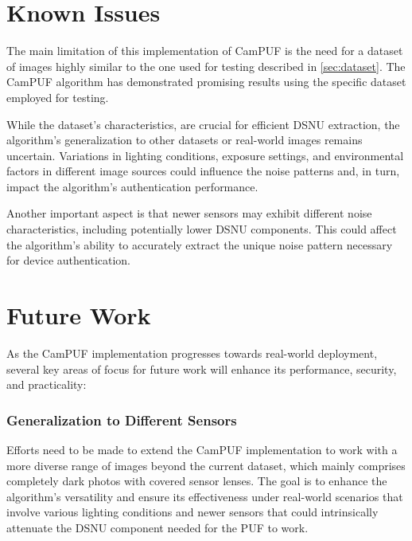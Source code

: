 \section{Known Issues}
The main limitation of this implementation of CamPUF is the need for a dataset of images highly similar to the one used for testing described in \ref{sec:dataset}. The CamPUF algorithm has demonstrated promising results using the specific dataset employed for testing.

While the dataset's characteristics, are crucial for efficient DSNU extraction, the algorithm's generalization to other datasets or real-world images remains uncertain. Variations in lighting conditions, exposure settings, and environmental factors in different image sources could influence the noise patterns and, in turn, impact the algorithm's authentication performance. 

Another important aspect is that newer sensors may exhibit different noise characteristics, including potentially lower DSNU components. This could affect the algorithm's ability to accurately extract the unique noise pattern necessary for device authentication.


\section{Future Work}
\label{sec:future_work}

As the CamPUF implementation progresses towards real-world deployment, several key areas of focus for future work will enhance its performance, security, and practicality:

\subsubsection{Generalization to Different Sensors}

Efforts need to be made to extend the CamPUF implementation to work with a more diverse range of images beyond the current dataset, which mainly comprises completely dark photos with covered sensor lenses. The goal is to enhance the algorithm's versatility and ensure its effectiveness under real-world scenarios that involve various lighting conditions and newer sensors that could intrinsically attenuate the DSNU component needed for the PUF to work.

